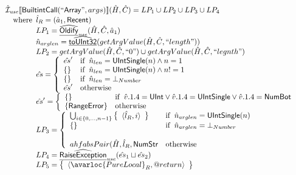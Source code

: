 \[\begin{array}{l}
\aI_{\it use}\lbr \SF{BuiltintCall}(``\SF{Array}",args)\rbr(\hat{H},\hat{C}) = LP_1 \cup LP_2 \cup LP_3 \cup LP_4\\
\quad\wherec{
  \hat{l}_R = (\hat{a}_1, \SF{Recent})\\
  LP_1 = \ahf{Oldify}_{\it use}(\hat{H},\hat{C}, \hat{a}_1)\\
  \hat{n}_{arglen} = \ahf{toUInt32}(getArgValue(\hat{H},\hat{C}, ``length"))\\
  LP_2 = getArgValue(\hat{H},\hat{C}, ``0") \cup  getArgValue(\hat{H},\hat{C}, ``legnth")\\
  \hat{es} = \left\{\begin{array}{ll}
      \hat{es}' & \ifc{\hat{n}_{len} = \SF{UIntSingle}(n) \land n = 1}\\
      \set{} & \ifc{\hat{n}_{len} = \SF{UIntSingle}(n) \land n != 1}\\
      \set{} & \ifc{\hat{n}_{len} = \bot_{Number}}\\
      \hat{es}' & \owc
    \end{array}\right.\\  
  \hat{es}' = \left\{\begin{array}{ll}
      \set{}
      & \ifc{\hat{v}.1.4 = \SF{UInt} \lor \hat{v}.1.4 = \SF{UIntSingle} \lor \hat{v}.1.4 = \SF{NumBot} }\\
      \{ \SF{RangeError} \} & \owc
    \end{array}\right.\\
  LP_3 = \left\{\begin{array}{ll}
      \bigcup_{i \in \{0, ..., n-1\}} \set{\langle \hat{l}_R, i\rangle}
      & \ifc{\hat{n}_{arglen} = \SF{UIntSingle}(n)}\\
      \set{} & \ifc{\hat{n}_{arglen} = \bot_{Number}}\\
      \\ahf{absPair}(\hat{H}, \hat{l}_R, \SF{NumStr} & \owc
    \end{array}\right.\\
  LP_4 = \ahf{RaiseException}_{\it use}(\hat{es}_1 \sqcup \hat{es}_2)\\
  LP_5 = \set{\langle\avarloc{PureLocal}_R,\varprop{return}\rangle}\\
  }\\
\\


\end{array}
\]
